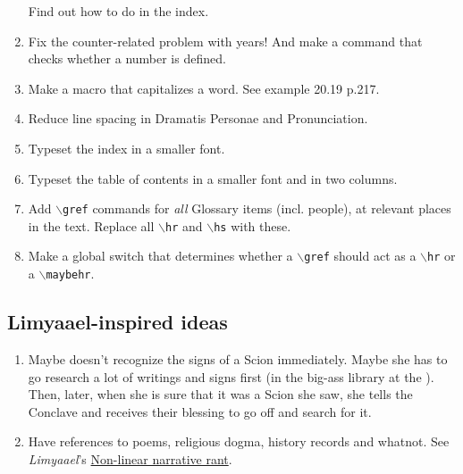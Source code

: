 \begin{garbage}
\begin{enumerate}
    Find out how to do  in the index. 
  \item   
    Fix the counter-related problem with years! 
    And make a command that checks whether a number is defined.
  \item 
    Make a macro that capitalizes a word. 
    See  example 20.19 p.217. 
  \item 
    Reduce line spacing in Dramatis Personae and Pronunciation. 
  \item 
    Typeset the index in a smaller font.
  \item 
    Typeset the table of contents in a smaller font and in two columns. 
  \item 
    Add \texttt{$\backslash$gref} commands for \emph{all} Glossary items (incl. people), at relevant places in the text. 
    Replace all \texttt{$\backslash$hr} and \texttt{$\backslash$hs} with these. 
  \item 
    Make a global switch that determines whether a \texttt{$\backslash$gref} should act as a \texttt{$\backslash$hr} or a \texttt{$\backslash$maybehr}. 
\end{enumerate}









\subsection{Limyaael-inspired ideas}
\begin{enumerate}
  \item
    Maybe \Esmerel{} doesn't recognize the signs of a Scion immediately. 
    Maybe she has to go research a lot of writings and signs first (in the big-ass library at the \TopazChateau). 
    Then, later, when she is sure that it was a Scion she saw, she tells the Conclave and receives their blessing to go off and search for it. 
  
  \item 
    Have references to poems, religious dogma, history records and whatnot. 
    See \emph{Limyaael}'s \href{http://limyaael.livejournal.com/357919.html}{Non-linear narrative rant}.
\end{enumerate}










\end{garbage}
